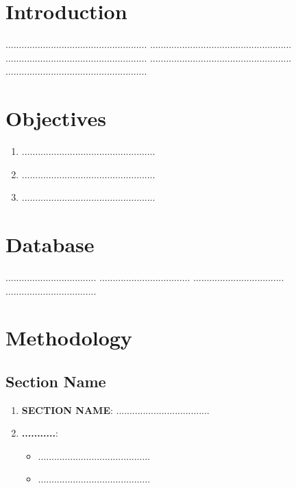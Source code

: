 \documentclass[12pt]{report}
\begin{document}
\chapter{Introduction}
.....................................................
.....................................................
.....................................................
.....................................................
.....................................................

\chapter{Objectives}
\begin{enumerate}

    \item ..................................................
    \item ..................................................
    \item ..................................................
  
\end{enumerate}

\chapter{Database}
..................................
..................................
..................................
..................................

\chapter{Methodology}
\section{Section Name}
\begin{enumerate}
    \item \textbf{SECTION NAME}: ...................................
    \item \textbf{...........}:
    
    \begin{itemize}
        \item ..........................................
        \item ..........................................
    \end{itemize}
\end{enumerate}
\end{document}
